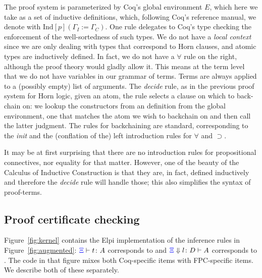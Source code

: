The proof system is parameterized by Coq's global environment $E$, which
here we take as a set of inductive definitions,
which, following Coq's reference manual, we denote with
$\mathrm{Ind}[p]  (\Gamma_I := \Gamma_C)$.  One  rule delegates
to Coq's type checking the enforcement of the well-sortedness of such types. We
do not have a \emph{local context} since we are only dealing with types
that correspond to Horn clauses, and atomic types are inductively
defined. In fact, we do not have a $\forall$ rule on the right,
although the proof theory would gladly allow it. This means at the
term level that we do not have variables in our grammar of
terms. Terms are always applied to a (possibly empty) list of
arguments.
The \emph{decide} rule, %
as in the previous proof system for Horn logic,  given an atom,
the rule selects a clause on which to back-chain on: we lookup the
constructors from an  definition from the global
environment, one that matches the atom we wish to backchain on and then
call the latter judgment. The rules for backchaining are standard,
corresponding to the \emph{init} and the (conflation of the) left introduction rules for
$\forall$ and $\supset$.

It may be at first surprising that there are no
introduction rules for propositional connectives, nor equality for
that matter. However, one of the beauty of the Calculus of Inductive
Construction is that they are, in fact,  defined inductively and
therefore the \emph{decide} rule will handle those; this also
simplifies the syntax of proof-terms.

\subsection{Proof certificate checking}
\label{ssec:cert}
Figure~\ref{fig:kernel} contains the Elpi implementation of the
inference rules in Figure~\ref{fig:augmented}: ${\color{blue}{\Xi}}\vdash t \colon A$ corresponds to
 and ${\color{blue}{\Xi}} \Downarrow  l \colon D\vdash A$ corresponds to
.
%
The code in that figure mixes both Coq-specific items with
FPC-specific items.  We describe both of these separately.

